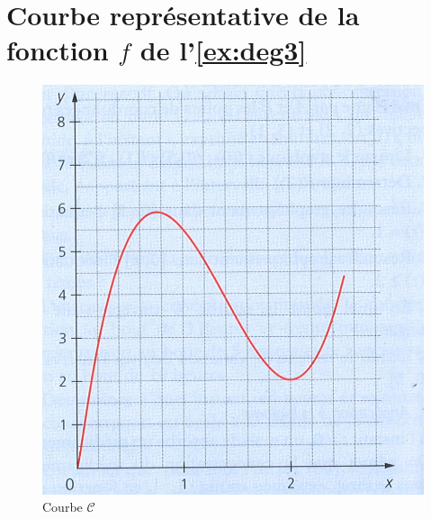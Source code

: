 \section{Courbe représentative de la fonction $f$ de l'\ref{ex:deg3}}\label{app:fig}

\begin{center}
	\begin{figure}[h]
		
		\includegraphics[scale=0.7]{img/courbe_31}
		
		\caption{Courbe $\mathcal{C}$}
		\label{fig:c}
	\end{figure}
\end{center}